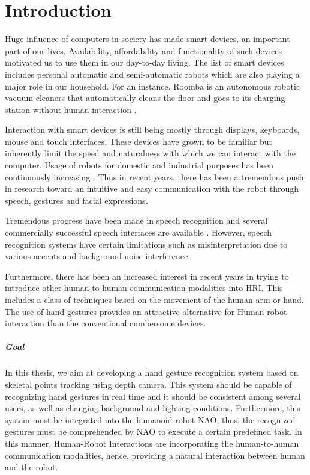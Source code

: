 \chapter{Introduction} Huge influence of computers in society has made smart devices, an important part of our lives. Availability, affordability and functionality of such devices motivated us to use them in our day-to-day living. The list of smart devices includes personal automatic and semi-automatic robots which are also playing a major role in our household. For an instance, Roomba is an autonomous robotic vacuum cleaners that automatically cleans the floor and goes to its charging station without human interaction \cite{4}.

Interaction with smart devices is still being mostly through displays, keyboards, mouse and touch interfaces. These devices have grown to be familiar but inherently limit the speed and naturalness with which we can interact with the computer. Usage of robots for domestic and industrial purposes has been continuously increasing \cite{5}. Thus in recent years, there has been a tremendous push in research toward an intuitive and easy communication with the robot through speech, gestures and facial expressions.

Tremendous progress have been made in speech recognition and several commercially successful speech interfaces are available \cite{6}. However, speech recognition systems have certain limitations such as misinterpretation due to various accents and background noise interference.

Furthermore, there has been an increased interest in recent years in trying to introduce other human-to-human communication modalities into HRI. This includes a class of techniques based on the movement of the human arm or hand. The use of hand gestures provides an attractive alternative for Human-robot interaction than the conventional cumbersome devices.

\paragraph*{Goal} In this thesis, we aim at developing a hand gesture recognition system based on skeletal points tracking using depth camera. This system should be capable of recognizing hand gestures in real time and it should be consistent among several users, as well as changing background and lighting conditions. Furthermore, this system must be integrated into the humanoid robot NAO, thus, the recognized gestures must be comprehended by NAO to execute a certain predefined task. In this manner, Human-Robot Interactions are incorporating the human-to-human communication modalities, hence, providing a natural interaction between human and the robot.


